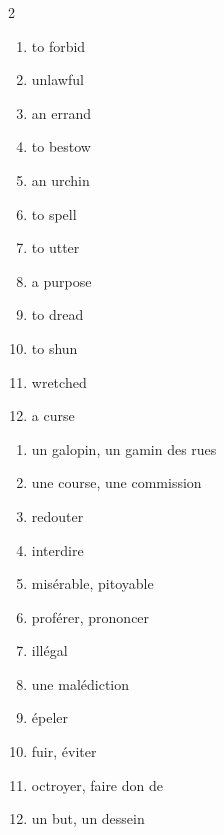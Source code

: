 \documentclass{fiche}
\begin{document}

\begin{multicols}{2}
\begin{enumerate}[label=\arabic*.,itemsep=1.2mm,leftmargin=*]
  \item to forbid \hfill {}
  \item unlawful \hfill {}
  \item an errand \hfill {}
  \item to bestow \hfill {}
  \item an urchin \hfill {}
  \item to spell \hfill {}
  \item to utter \hfill {}
  \item a purpose \hfill {}
  \item to dread \hfill {}
  \item to shun \hfill {}
  \item wretched \hfill {}
  \item a curse \hfill {}
\end{enumerate}
\columnbreak
\begin{enumerate}[label=\alph*.,itemsep=1.2mm,leftmargin=*]
  \item un galopin, un gamin des rues
  \item une course, une commission
  \item redouter
  \item interdire
  \item misérable, pitoyable
  \item proférer, prononcer
  \item illégal
  \item une malédiction
  \item épeler
  \item fuir, éviter
  \item octroyer, faire don de
  \item un but, un dessein
\end{enumerate}
\end{multicols}

\end{document}
